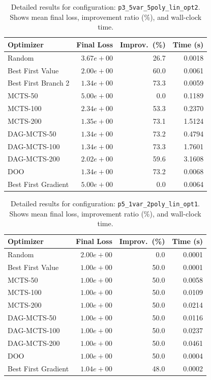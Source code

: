 \begin{table}[H]
\centering
\caption{Detailed results for configuration: \texttt{p3\_5var\_5poly\_lin\_opt2}. Shows mean final loss, improvement ratio (\%), and wall-clock time.}
\label{tab:abssum-detail-24}
\begin{tabular}{lrrr}
\toprule
Optimizer & Final Loss & Improv.~(\%) & Time (s) \\
\midrule
Random & $3.67e+00$ & 26.7 & 0.0018 \\
\hline
Best First Value & $2.00e+00$ & 60.0 & 0.0061 \\
\hline
Best First Branch 2 & \textbf{$1.34e+00$} & 73.3 & 0.0059 \\
\hline
MCTS-50 & $5.00e+00$ & 0.0 & 0.1189 \\
\hline
MCTS-100 & $2.34e+00$ & 53.3 & 0.2370 \\
\hline
MCTS-200 & $1.35e+00$ & 73.1 & 1.5124 \\
\hline
DAG-MCTS-50 & $1.34e+00$ & 73.2 & 0.4794 \\
\hline
DAG-MCTS-100 & $1.34e+00$ & 73.3 & 1.7601 \\
\hline
DAG-MCTS-200 & $2.02e+00$ & 59.6 & 3.1608 \\
\hline
DOO & $1.34e+00$ & 73.2 & 0.0068 \\
\hline
Best First Gradient & $5.00e+00$ & 0.0 & 0.0064 \\
\bottomrule
\end{tabular}
\end{table}

\begin{table}[H]
\centering
\caption{Detailed results for configuration: \texttt{p5\_1var\_2poly\_lin\_opt1}. Shows mean final loss, improvement ratio (\%), and wall-clock time.}
\label{tab:abssum-detail-25}
\begin{tabular}{lrrr}
\toprule
Optimizer & Final Loss & Improv.~(\%) & Time (s) \\
\midrule
Random & $2.00e+00$ & 0.0 & 0.0001 \\
\hline
Best First Value & \textbf{$1.00e+00$} & 50.0 & 0.0001 \\
\hline
MCTS-50 & \textbf{$1.00e+00$} & 50.0 & 0.0058 \\
\hline
MCTS-100 & \textbf{$1.00e+00$} & 50.0 & 0.0109 \\
\hline
MCTS-200 & \textbf{$1.00e+00$} & 50.0 & 0.0214 \\
\hline
DAG-MCTS-50 & \textbf{$1.00e+00$} & 50.0 & 0.0116 \\
\hline
DAG-MCTS-100 & \textbf{$1.00e+00$} & 50.0 & 0.0237 \\
\hline
DAG-MCTS-200 & \textbf{$1.00e+00$} & 50.0 & 0.0461 \\
\hline
DOO & $1.00e+00$ & 50.0 & 0.0004 \\
\hline
Best First Gradient & $1.04e+00$ & 48.0 & 0.0002 \\
\bottomrule
\end{tabular}
\end{table}


